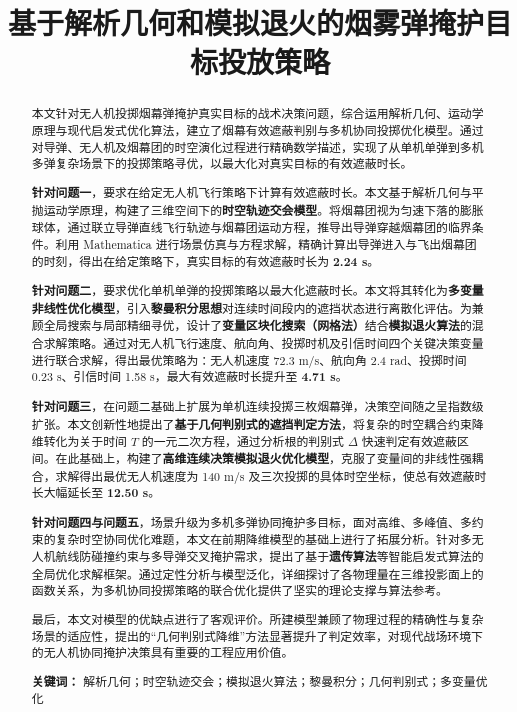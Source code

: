 \documentclass{article}
\title{{\fontsize{18pt}{\baselineskip}\selectfont 基于解析几何和模拟退火的烟雾弹掩护目标投放策略}}
\date{}
\begin{document}
\maketitle

\vspace{-1em}


\begin{abstract}
\normalsize
本文针对无人机投掷烟幕弹掩护真实目标的战术决策问题，综合运用解析几何、运动学原理与现代启发式优化算法，建立了烟幕有效遮蔽判别与多机协同投掷优化模型。通过对导弹、无人机及烟幕团的时空演化过程进行精确数学描述，实现了从单机单弹到多机多弹复杂场景下的投掷策略寻优，以最大化对真实目标的有效遮蔽时长。

\textbf{针对问题一}，要求在给定无人机飞行策略下计算有效遮蔽时长。本文基于解析几何与平抛运动学原理，构建了三维空间下的\textbf{时空轨迹交会模型}。将烟幕团视为匀速下落的膨胀球体，通过联立导弹直线飞行轨迹与烟幕团运动方程，推导出导弹穿越烟幕团的临界条件。利用 Mathematica 进行场景仿真与方程求解，精确计算出导弹进入与飞出烟幕团的时刻，得出在给定策略下，真实目标的有效遮蔽时长为 \textbf{2.24 s}。

\textbf{针对问题二}，要求优化单机单弹的投掷策略以最大化遮蔽时长。本文将其转化为\textbf{多变量非线性优化模型}，引入\textbf{黎曼积分思想}对连续时间段内的遮挡状态进行离散化评估。为兼顾全局搜索与局部精细寻优，设计了\textbf{变量区块化搜索（网格法）}结合\textbf{模拟退火算法}的混合求解策略。通过对无人机飞行速度、航向角、投掷时机及引信时间四个关键决策变量进行联合求解，得出最优策略为：无人机速度 72.3 m/s、航向角 2.4 rad、投掷时间 0.23 s、引信时间 1.58 s，最大有效遮蔽时长提升至 \textbf{4.71 s}。

\textbf{针对问题三}，在问题二基础上扩展为单机连续投掷三枚烟幕弹，决策空间随之呈指数级扩张。本文创新性地提出了\textbf{基于几何判别式的遮挡判定方法}，将复杂的时空耦合约束降维转化为关于时间 $T$ 的一元二次方程，通过分析根的判别式 $\Delta$ 快速判定有效遮蔽区间。在此基础上，构建了\textbf{高维连续决策模拟退火优化模型}，克服了变量间的非线性强耦合，求解得出最优无人机速度为 140 m/s 及三次投掷的具体时空坐标，使总有效遮蔽时长大幅延长至 \textbf{12.50 s}。

\textbf{针对问题四与问题五}，场景升级为多机多弹协同掩护多目标，面对高维、多峰值、多约束的复杂时空协同优化难题，本文在前期降维模型的基础上进行了拓展分析。针对多无人机航线防碰撞约束与多导弹交叉掩护需求，提出了基于\textbf{遗传算法}等智能启发式算法的全局优化求解框架。通过定性分析与模型泛化，详细探讨了各物理量在三维投影面上的函数关系，为多机协同投掷策略的联合优化提供了坚实的理论支撑与算法参考。

最后，本文对模型的优缺点进行了客观评价。所建模型兼顾了物理过程的精确性与复杂场景的适应性，提出的“几何判别式降维”方法显著提升了判定效率，对现代战场环境下的无人机协同掩护决策具有重要的工程应用价值。
\vspace{1.5em}

\noindent \textbf{关键词：} 解析几何；时空轨迹交会；模拟退火算法；黎曼积分；几何判别式；多变量优化
\end{abstract}
\end{document}
